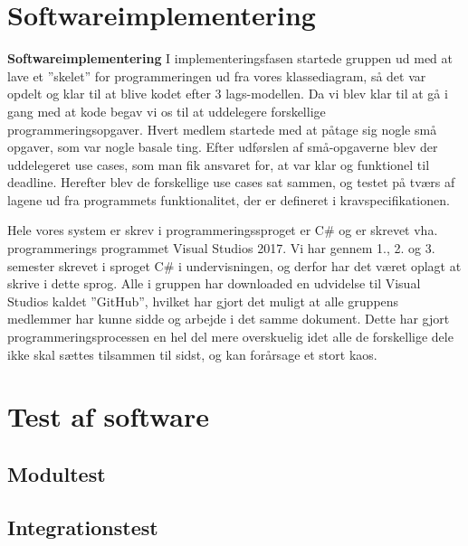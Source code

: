 \section{Softwareimplementering}
\textbf{Softwareimplementering}
I implementeringsfasen startede gruppen ud med at lave et ”skelet” for programmeringen ud fra vores klassediagram, så det var opdelt og klar til at blive kodet efter 3 lags-modellen. Da vi blev klar til at gå i gang med at kode begav vi os til at uddelegere forskellige programmeringsopgaver. Hvert medlem startede med at påtage sig nogle små opgaver, som var nogle basale ting. Efter udførslen af små-opgaverne blev der uddelegeret use cases, som man fik ansvaret for, at var klar og funktionel til deadline. Herefter blev de forskellige use cases sat sammen, og testet på tværs af lagene ud fra programmets funktionalitet, der er defineret i kravspecifikationen. 

Hele vores system er skrev i programmeringssproget er C# og er skrevet vha. programmerings programmet Visual Studios 2017.  Vi har gennem 1., 2. og 3. semester skrevet i sproget C# i undervisningen, og derfor har det været oplagt at skrive i dette sprog. Alle i gruppen har downloaded en udvidelse til Visual Studios kaldet ”GitHub”, hvilket har gjort det muligt at alle gruppens medlemmer har kunne sidde og arbejde i det samme dokument. Dette har gjort programmeringsprocessen en hel del mere overskuelig idet alle de forskellige dele ikke skal sættes tilsammen til sidst, og kan forårsage et stort kaos. 
\section{Test af software}
\subsection{Modultest}
\subsection{Integrationstest}
